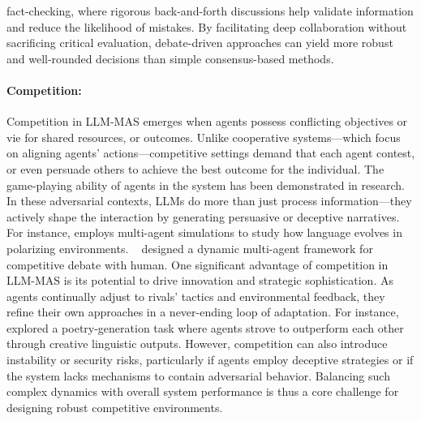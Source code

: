 fact-checking\cite{debate_2}, where rigorous back-and-forth discussions help validate information and reduce the likelihood of mistakes. By facilitating deep collaboration without sacrificing critical evaluation, debate-driven approaches can yield more robust and well-rounded decisions than simple consensus-based methods.

\paragraph{Competition:}Competition in LLM-MAS emerges when agents possess conflicting objectives or vie for shared resources, or outcomes. Unlike cooperative systems—which focus on aligning agents’ actions—competitive settings demand that each agent contest, or even persuade others to achieve the best outcome for the individual. The game-playing ability of agents in the system has been demonstrated in research. ~\cite{evaluating_llm_game_ability} In these adversarial contexts, LLMs do more than just process information—they actively shape the interaction by generating persuasive or deceptive narratives. For instance, \cite{social_media_regulation} employs multi-agent simulations to study how language evolves in polarizing environments. ~\cite{agent4debate} designed a dynamic multi-agent framework for competitive debate with human.  One significant advantage of competition in LLM-MAS is its potential to drive innovation and strategic sophistication. As agents continually adjust to rivals’ tactics and environmental feedback, they refine their own approaches in a never-ending loop of adaptation. For instance,~\cite{mas_for_poetry_generation} explored a poetry-generation task where agents strove to outperform each other through creative linguistic outputs. However, competition can also introduce instability or security risks, particularly if agents employ deceptive strategies or if the system lacks mechanisms to contain adversarial behavior. Balancing such complex dynamics with overall system performance is thus a core challenge for designing robust competitive environments.


